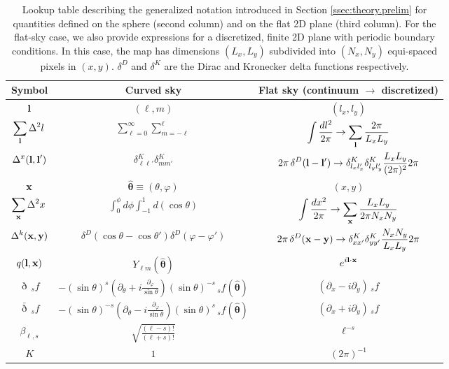 \documentclass[a4paper,11pt]{article}
\newcommand{\nv}{\hat{\boldsymbol{\theta}}}
\newcommand{\summ}[1]{\sum_{\bf #1}\Delta^2 #1\,}
\begin{document}
      \begin{table}
        \centering
        \begin{tabular}{|c|c|c|}
          \hline
          Symbol & Curved sky & Flat sky (continuum $\rightarrow$ discretized) \\
          \hline
          \(\displaystyle {\bf l} \) & \(\displaystyle (\ell,m) \) & \(\displaystyle (l_x,l_y) \) \\
          \(\displaystyle \summ{l} \) & \(\displaystyle \sum_{\ell=0}^{\infty} \sum_{m=-\ell}^{\ell} \) & \(\displaystyle \int \frac{dl^2}{2\pi} \rightarrow \sum_{\bf l}\frac{2\pi}{L_xL_y}\) \\
          \(\displaystyle \Delta^x({\bf l},{\bf l}')\) & \(\displaystyle \delta^K_{\ell\ell'}\delta^K_{mm'}\) & \(\displaystyle 2\pi\,\delta^D({\bf l}-{\bf l}')\rightarrow \delta^K_{l_xl'_x}\delta^K_{l_yl'_y}\frac{L_xL_y}{(2\pi)^2}2\pi\) \\
          \(\displaystyle {\bf x}\) & \(\displaystyle \nv\equiv(\theta,\varphi) \) & \(\displaystyle (x,y)\) \\
          \(\displaystyle \summ{x} \) & \(\displaystyle \int_0^{\phi} d\phi \int_{-1}^{1} d(\cos\theta)\) & \(\displaystyle \int \frac{dx^2}{2\pi}\rightarrow\sum_{\bf x}\frac{L_xL_y}{2\pi N_xN_y}\) \\
          \(\displaystyle \Delta^k({\bf x},{\bf y})\) & \(\displaystyle \delta^D(\cos\theta-\cos\theta')\delta^D(\varphi-\varphi')\) & \(\displaystyle 2\pi\,\delta^D({\bf x}-{\bf y})\rightarrow\delta^K_{xx'}\delta^K_{yy'}\frac{N_xN_y}{L_xL_y}2\pi\) \\
          \(\displaystyle q({\bf l},{\bf x})\) & \(\displaystyle Y_{\ell m}(\nv)\) & \(\displaystyle e^{i{\bf l}\cdot{\bf x}}\) \\
          \(\displaystyle \eth\,_sf\) & \(\displaystyle -(\sin\theta)^s\left(\partial_\theta+i\frac{\partial_\varphi}{\sin\theta}\right)(\sin\theta)^{-s}\,_sf(\nv)\) & \(\displaystyle (\partial_x-i\partial_y)\,_sf\) \\
          \(\displaystyle \bar{\eth}\,_sf\) & \(\displaystyle -(\sin\theta)^{-s}\left(\partial_\theta-i\frac{\partial_\varphi}{\sin\theta}\right)(\sin\theta)^s\,_sf(\nv)\) & \(\displaystyle (\partial_x+i\partial_y)\,_sf\) \\
          \(\displaystyle \beta_{\ell,s}\) & \(\displaystyle \sqrt{\frac{(\ell-s)!}{(\ell+s)!}}\) & \(\displaystyle \ell^{-s}\) \\
          \(\displaystyle K \) & \(\displaystyle 1 \) & \(\displaystyle (2\pi)^{-1}\) \\
          \hline
        \end{tabular}
        \caption{Lookup table describing the generalized notation introduced in Section \ref{ssec:theory.prelim} for quantities defined on the sphere (second column) and on the flat 2D plane (third column). For the flat-sky case, we also provide expressions for a discretized, finite 2D plane with periodic boundary conditions. In this case, the map has dimensions $(L_x,L_y)$ subdivided into $(N_x,N_y)$ equi-spaced pixels in $(x,y)$. $\delta^D$ and $\delta^K$ are the Dirac and Kronecker delta functions respectively.}\label{tab:notation}
      \end{table}
\end{document}
